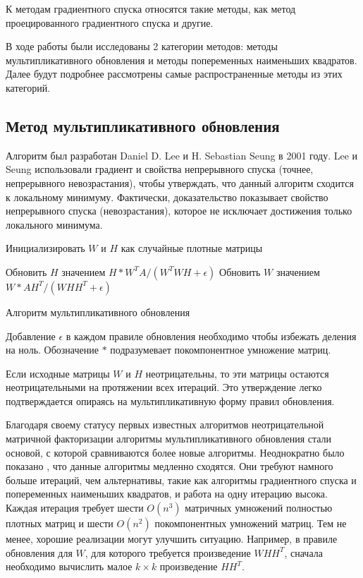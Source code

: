 К методам градиентного спуска относятся такие методы, как метод проецированного градиентного спуска \cite{lin} и другие.

В ходе работы были исследованы 2 категории методов: методы мультипликативного обновления и методы попеременных наименьших квадратов.
Далее будут подробнее рассмотрены самые распространенные методы из этих категорий.



\newpage



\subsection{Метод мультипликативного обновления}

Алгоритм был разработан Daniel D. Lee и H. Sebastian Seung в 2001 году.
Lee и Seung использовали градиент и свойства непрерывного спуска (точнее, непрерывного невозрастания),
чтобы утверждать, что данный алгоритм сходится к локальному минимуму.
Фактически, доказательство показывает свойство непрерывного спуска (невозрастания),
которое не исключает достижения только локального минимума.

\begin{algorithm}
  \BlankLine
  \BlankLine


  \BlankLine

  Инициализировать $W$ и $H$ как случайные плотные матрицы\;

   {
    Обновить $H$ значением $H * W^T A / (W^T W H + \epsilon)$\;
    Обновить $W$ значением $W * A H^T / (W H H^T + \epsilon)$\;
  }

  \BlankLine

  \caption{Алгоритм мультипликативного обновления}
\end{algorithm}

Добавление $\epsilon$ в каждом правиле обновления необходимо чтобы избежать деления на ноль.
Обозначение $*$ подразумевает покомпонентное умножение матриц.

Если исходные матрицы $W$ и $H$ неотрицательны, то эти матрицы остаются неотрицательными на протяжении всех итераций.
Это утверждение легко подтверждается опираясь на мультипликативную форму правил обновления.

Благодаря своему статусу первых известных алгоритмов неотрицательной матричной факторизации
алгоритмы мультипликативного обновления стали основой,
с которой сравниваются более новые алгоритмы.
Неоднократно было показано \cite{langville}, что данные алгоритмы медленно сходятся.
Они требуют намного больше итераций, чем альтернативы, такие как алгоритмы градиентного спуска и попеременных наименьших квадратов, и работа на одну итерацию высока.
Каждая итерация требует шести $O(n^3)$ матричных умножений полностью плотных матриц и шести $O(n^2)$ покомпонентных умножений матриц.
Тем не менее, хорошие реализации могут улучшить ситуацию.
Например, в правиле обновления для $W$, для которого требуется произведение $WHH^T$, сначала необходимо вычислить малое $k \times k$ произведение $HH^T$.


